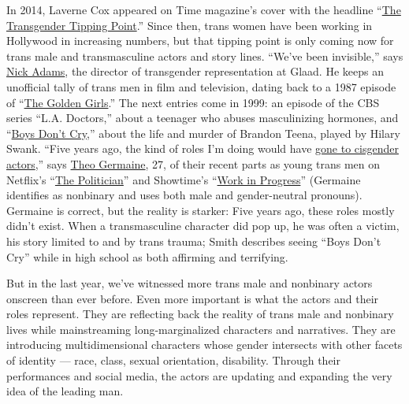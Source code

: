 In 2014, Laverne Cox appeared on Time magazine's cover with the headline
``\href{https://time.com/135480/transgender-tipping-point/}{The
Transgender Tipping Point}.'' Since then, trans women have been working
in Hollywood in increasing numbers, but that tipping point is only
coming now for trans male and transmasculine actors and story lines.
``We've been invisible,'' says
\href{https://www.glaad.org/nick-adams-director-transgender-media-representation}{Nick
Adams}, the director of transgender representation at Glaad. He keeps an
unofficial tally of trans men in film and television, dating back to a
1987 episode of
``\href{https://www.nytimes3xbfgragh.onion/watching/recommendations/the-golden-girls?auto=true}{The
Golden Girls}.'' The next entries come in 1999: an episode of the CBS
series ``L.A. Doctors,'' about a teenager who abuses masculinizing
hormones, and
``\href{https://www.nytimes3xbfgragh.onion/2019/10/09/movies/boys-dont-cry-anniversary.html}{Boys
Don't Cry},'' about the life and murder of Brandon Teena, played by
Hilary Swank. ``Five years ago, the kind of roles I'm doing would have
\href{https://www.nytimes3xbfgragh.onion/2015/09/04/movies/who-gets-to-play-the-transgender-part-in-hollywood.html}{gone
to cisgender actors},'' says
\href{https://www.instagram.com/theogermaine/?hl=en}{Theo Germaine}, 27,
of their recent parts as young trans men on Netflix's
``\href{https://www.nytimes3xbfgragh.onion/2019/09/26/business/media/netflix-ryan-murphy-the-politician.html}{The
Politician}'' and Showtime's
``\href{https://www.nytimes3xbfgragh.onion/2020/01/23/arts/television/david-lynch-netflix-work-in-progress-showtime.html}{Work
in Progress}'' (Germaine identifies as nonbinary and uses both male and
gender-neutral pronouns). Germaine is correct, but the reality is
starker: Five years ago, these roles mostly didn't exist. When a
transmasculine character did pop up, he was often a victim, his story
limited to and by trans trauma; Smith describes seeing ``Boys Don't
Cry'' while in high school as both affirming and terrifying.

But in the last year, we've witnessed more trans male and nonbinary
actors onscreen than ever before. Even more important is what the actors
and their roles represent. They are reflecting back the reality of trans
male and nonbinary lives while mainstreaming long-marginalized
characters and narratives. They are introducing multidimensional
characters whose gender intersects with other facets of identity ---
race, class, sexual orientation, disability. Through their performances
and social media, the actors are updating and expanding the very idea of
the leading man.

